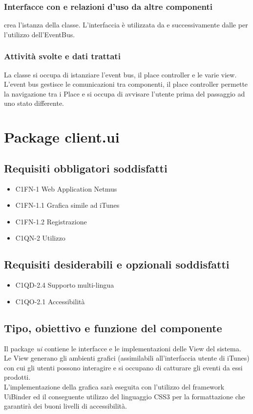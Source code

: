 \subsubsection*{Interfacce con e relazioni d'uso da altre componenti}
 crea l'istanza della classe. L'interfaccia  \`e
utilizzata da  e successivamente dalle  per
l'utilizzo dell'EventBus.
\subsubsection*{Attivit\`a svolte e dati trattati}
La classe si occupa di istanziare l'event bus, il place controller e le varie
view. L'event bus gestisce le comunicazioni tra componenti, il place
controller permette la navigazione tra i Place e si occupa di avvisare
l'utente prima del passaggio ad uno stato differente.


\newpage
\section{Package client.ui} %
\subsection*{Requisiti obbligatori soddisfatti}
\begin{itemize}
	\item C1FN-1 Web Application Netmus
	\item C1FN-1.1 Grafica simile ad iTunes
	\item C1FN-1.2 Registrazione
	\item C1QN-2 Utilizzo
\end{itemize}
\subsection*{Requisiti desiderabili e opzionali soddisfatti}
\begin{itemize}
    \item C1QD-2.4 Supporto multi-lingua
    \item C1QO-2.1 Accessibilit\`a
\end{itemize}
\subsection*{Tipo, obiettivo e funzione del componente}
Il package \emph{ui} contiene le interfacce e le implementazioni delle View del
sistema. Le View generano gli ambienti grafici (assimilabili all'interfaccia
utente di iTunes) con cui gli utenti possono interagire e si occupano di
catturare gli eventi da essi prodotti. \\
L'implementazione della grafica sar\`a eseguita con l'utilizzo del framework
UiBinder ed il conseguente utilizzo del linguaggio CSS3 per la formattazione
che garantir\`a dei buoni livelli di accessibilit\`a.
